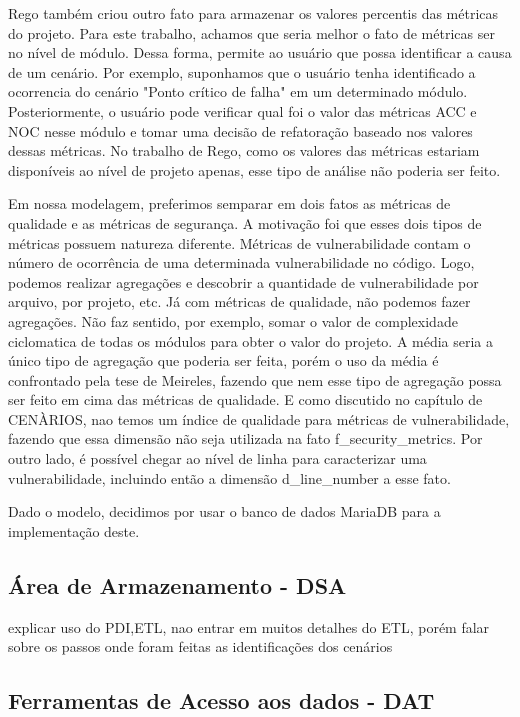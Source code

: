 Rego também criou outro fato para armazenar os valores percentis das métricas do projeto. Para este trabalho, achamos que seria melhor o fato de métricas ser no nível de módulo. Dessa forma, permite ao usuário que possa identificar a causa de um cenário. Por exemplo, suponhamos que o usuário tenha identificado a ocorrencia do cenário "Ponto crítico de falha" em um determinado módulo. Posteriormente, o usuário pode verificar qual foi o valor das métricas ACC e NOC nesse módulo e tomar uma decisão de refatoração baseado nos valores dessas métricas. No trabalho de Rego, como os valores das métricas estariam disponíveis ao nível de projeto apenas, esse tipo de análise não poderia ser feito.

Em nossa modelagem, preferimos semparar em dois fatos as métricas de qualidade e as métricas de segurança. A motivação foi que esses dois tipos de métricas possuem natureza diferente. Métricas de vulnerabilidade contam o número de ocorrência de uma determinada vulnerabilidade no código. Logo, podemos realizar agregações e descobrir a quantidade de vulnerabilidade por arquivo, por projeto, etc. Já com métricas de qualidade, não podemos fazer agregações. Não faz sentido, por exemplo, somar o valor de complexidade ciclomatica de todas os módulos para obter o valor do projeto. A média seria a único tipo de agregação que poderia ser feita, porém o uso da média é confrontado pela tese de Meireles, fazendo que nem esse tipo de agregação possa ser feito em cima das métricas de qualidade. E como discutido no capítulo de CENÀRIOS, nao temos um índice de qualidade para métricas de vulnerabilidade, fazendo que essa dimensão não seja utilizada na fato f\_security\_metrics. Por outro lado, é possível chegar ao nível de linha para caracterizar uma vulnerabilidade, incluindo então a dimensão d\_line\_number a esse fato.

Dado o modelo, decidimos por usar o banco de dados MariaDB para a implementação deste.



\subsection{Área de Armazenamento - DSA}

explicar uso do PDI,ETL, nao entrar em muitos detalhes do ETL, porém falar sobre os passos onde foram feitas as identificações dos cenários


\subsection{Ferramentas de Acesso aos dados - DAT}

